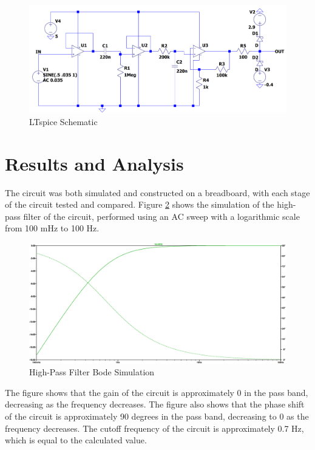 \documentclass[CMPE]{KGCOEReport}
\begin{document}
\begin{figure}[H]
    \centering
    \includegraphics[width=1\textwidth]{LTspiceSchematic.png}
    \caption{LTspice Schematic}
    \label{fig:ltspiceSchematic}
\end{figure}

\section*{Results and Analysis}

The circuit was both simulated and constructed on a breadboard, with each stage of the circuit tested and compared. Figure \ref{fig:highPassSim} shows the simulation of the high-pass filter of the circuit, performed using an AC sweep with a logarithmic scale from 100 mHz to 100 Hz.

\begin{figure}[H]
    \centering
    \includegraphics[width=1\textwidth]{SimFreqHighPass.png}
    \caption{High-Pass Filter Bode Simulation}
    \label{fig:highPassSim}
\end{figure}

The figure shows that the gain of the circuit is approximately 0 in the pass band, decreasing as the frequency decreases. The figure also shows that the phase shift of the circuit is approximately 90 degrees in the pass band, decreasing to 0 as the frequency decreases. The cutoff frequency of the circuit is approximately 0.7 Hz, which is equal to the calculated value.
\end{document}
